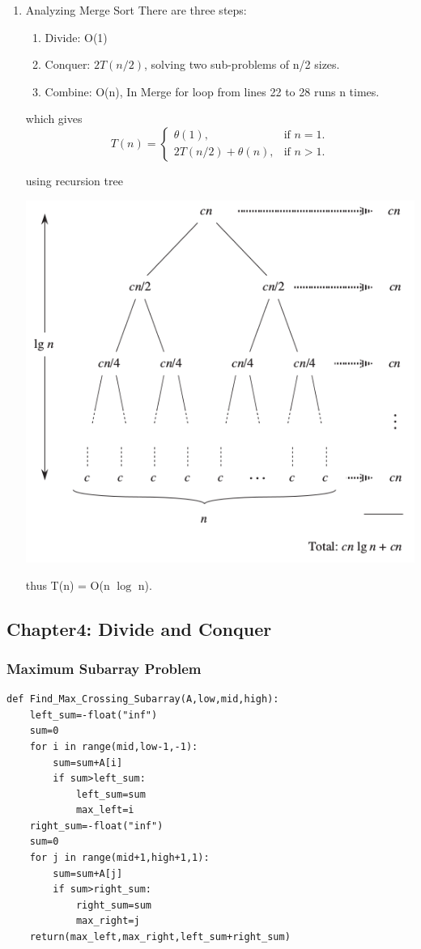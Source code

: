 \documentclass[11pt]{article}
\begin{document}
\begin{enumerate}
\item Analyzing Merge Sort
\label{sec:org1777c67}
There are three steps:
\begin{enumerate}
\item Divide: O(1)
\item Conquer: \(2T(n/2)\), solving two sub-problems of n/2 sizes.
\item Combine: O(n), In Merge for loop from lines 22 to 28 runs n times.
\end{enumerate}
which gives \\
\begin{equation}
T(n) = \begin{cases}
\theta(1), & \text{if $n=1$}.\\
2T(n/2) + \theta(n), & \text{if $n>1$}.
\end{cases}
\end{equation}

using recursion tree \begin{center}
\includegraphics[width=.9\linewidth]{./img/mergesort.png}
\end{center}

thus T(n) = O(n \(\log\) n).
\end{enumerate}
\subsection{Chapter4: Divide and Conquer}
\label{sec:org171b1db}
\subsubsection{Maximum Subarray Problem}
\label{sec:org316d8c3}
\begin{verbatim}
def Find_Max_Crossing_Subarray(A,low,mid,high):
    left_sum=-float("inf")
    sum=0
    for i in range(mid,low-1,-1):
        sum=sum+A[i]
        if sum>left_sum:
            left_sum=sum
            max_left=i
    right_sum=-float("inf")
    sum=0
    for j in range(mid+1,high+1,1):
        sum=sum+A[j]
        if sum>right_sum:
            right_sum=sum
            max_right=j
    return(max_left,max_right,left_sum+right_sum)
\end{verbatim}
\end{document}
